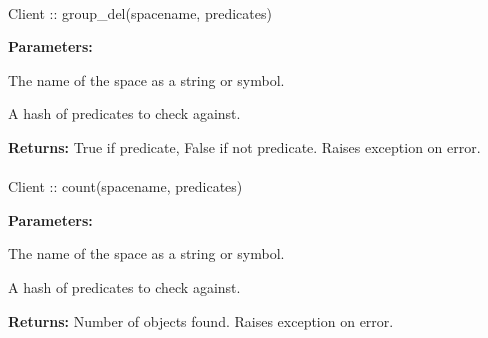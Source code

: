 \paragraph{}
\begin{ccode}
Client :: group_del(spacename, predicates)
\end{ccode}
\funcdesc 

\noindent\textbf{Parameters:}
\begin{description}[labelindent=\widthof{{\code{predicates}}},leftmargin=*,noitemsep,nolistsep,align=right]
\item[\code{spacename}] The name of the space as a string or symbol.
\item[\code{predicates}] A hash of predicates to check against.
\end{description}

\noindent\textbf{Returns:}
True if predicate, False if not predicate.  Raises exception on error.

\paragraph{}
\begin{ccode}
Client :: count(spacename, predicates)
\end{ccode}
\funcdesc 

\noindent\textbf{Parameters:}
\begin{description}[labelindent=\widthof{{\code{predicates}}},leftmargin=*,noitemsep,nolistsep,align=right]
\item[\code{spacename}] The name of the space as a string or symbol.
\item[\code{predicates}] A hash of predicates to check against.
\end{description}

\noindent\textbf{Returns:}
Number of objects found.  Raises exception on error.
